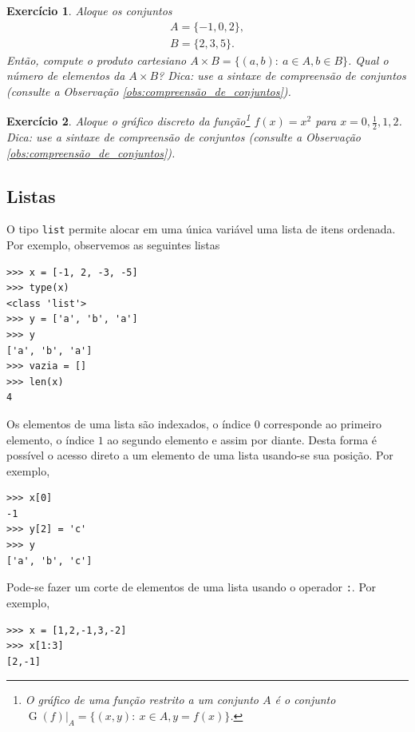 \documentclass[12pt]{article}
\newtheorem{exr}{Exercício}[section]
\begin{document}
\begin{exr}
  Aloque os conjuntos
  \begin{gather}
    A = \{-1, 0, 2\},\\
    B = \{2, 3, 5\}.
  \end{gather}
  Então, compute o produto cartesiano $A\times B=\{(a,b):~a\in A, b\in B\}$. Qual o número de elementos da $A\times B$? Dica: use a sintaxe de compreensão de conjuntos (consulte a Observação \ref{obs:compreensão_de_conjuntos}).
\end{exr}

\begin{exr}
  Aloque o gráfico discreto da função\footnote{O gráfico de uma função restrito a um conjunto $A$ é o conjunto $\operatorname{G}(f)|_{A} = \{(x,y):~x\in A, y=f(x)\}$.} $f(x) = x^2$ para $x=0, \frac{1}{2}, 1, 2$. Dica: use a sintaxe de compreensão de conjuntos (consulte a Observação \ref{obs:compreensão_de_conjuntos}).
\end{exr}

\subsection{Listas}

O tipo {\python} \lstinline+list+ permite alocar em uma única variável uma lista de itens ordenada. Por exemplo, observemos as seguintes listas
\begin{lstlisting}
>>> x = [-1, 2, -3, -5]
>>> type(x)
<class 'list'>
>>> y = ['a', 'b', 'a']
>>> y
['a', 'b', 'a']
>>> vazia = []
>>> len(x)
4
\end{lstlisting}

Os elementos de uma lista são indexados, o índice $0$ corresponde ao primeiro elemento, o índice $1$ ao segundo elemento e assim por diante. Desta forma é possível o acesso direto a um elemento de uma lista usando-se sua posição. Por exemplo,
\begin{lstlisting}
>>> x[0]
-1
>>> y[2] = 'c'
>>> y
['a', 'b', 'c']
\end{lstlisting}
Pode-se fazer um corte de elementos de uma lista usando o operador \lstinline+:+. Por exemplo,
\begin{lstlisting}
>>> x = [1,2,-1,3,-2]
>>> x[1:3]
[2,-1]
\end{lstlisting}
\end{document}
